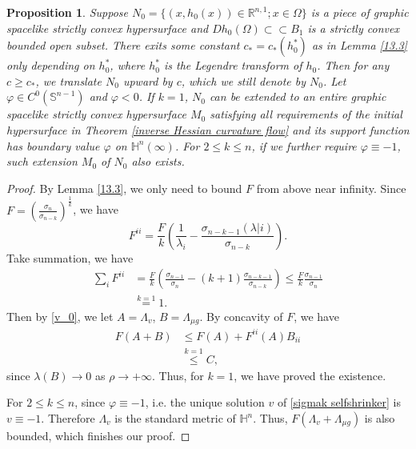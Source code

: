 \documentclass[reqno]{amsart}
\newtheorem{proposition}[theorem]{Proposition}
\theoremstyle{remark}
\theoremstyle{definition}
\numberwithin{equation}{section}
\begin{document}
\begin{proposition}
Suppose $N_0=\{(x,h_0(x))\in \mathbb{R}^{n,1}; x\in \Omega \}$ is a piece of graphic spacelike strictly convex hypersurface and $Dh_0(\Omega) \subset \subset B_1$ is a strictly convex bounded open subset. There exits some constant  $c_* = c_*(h^*_0)$  as in Lemma \ref{13.3} only depending on $h^*_0$, where $h^*_0$ is the Legendre transform of $h_0$. Then for any $c \geqslant c_*$, we translate $N_0$ upward by $c$, which we still denote by $N_0$. Let $\varphi \in C^0(\mathbb{S}^{n-1})$ and $\varphi<0$. If $k = 1$, $N_0$ can be extended to an entire graphic spacelike strictly convex hypersurface $M_0$ satisfying all requirements of the initial hypersurface in Theorem \ref{inverse Hessian curvature flow}  and its support function has  boundary value  $\varphi $ on $\mathbb{H}^n(\infty)$.
For $2 \leqslant k \leqslant n$, if we further require $\varphi \equiv -1$,  such extension $M_0$ of $N_0$ also exists. 
\end{proposition}
\begin{proof}
By Lemma \ref{13.3}, we only need to bound $F$ from above near infinity. Since $F = \left( \frac{\sigma_n}{\sigma_{n-k}} \right)^{\frac{1}{k}}$, we have
\[
F^{ii} = \frac{F}{k}\left( \frac{1}{\lambda_i} - \frac{\sigma_{n-k-1}(\lambda|i)}{\sigma_{n-k}} \right).
\]
Take summation, we have
\begin{align*}
    \sum_i F^{ii} &= \frac{F}{k}\left( \frac{\sigma_{n-1}}{\sigma_n} - \left( k+1 \right)\frac{\sigma_{n-k-1}}{\sigma_{n-k}} \right) \leqslant \frac{F}{k} \frac{\sigma_{n-1}}{\sigma_n} \\
    &\overset{k=1}{=} 1.
\end{align*}
Then by \eqref{v_0}, we let $A = \Lambda_{v}$, $B = \Lambda_{\mu g}$. By concavity of $F$, we have
\begin{align*}
    F(A+B) &\leqslant F(A) + F^{ii}(A)B_{ii} \\
    &\overset{k=1}{\leqslant} C,
\end{align*} 
since $\lambda(B) \to 0$ as $\rho \to +\infty$. Thus, for $k=1$, we have proved the existence.  

For $2\leqslant k\leqslant n$, since $\varphi \equiv -1$, i.e. the unique solution $v$ of  \eqref{sigmak selfshrinker} is $v \equiv -1$. Therefore $\Lambda_{v}$ is the standard metric of $\mathbb{H}^n$. Thus,  
$F(\Lambda_v+\Lambda_{\mu g})$ is also bounded, which finishes our proof. 
\end{proof}
\end{document}
